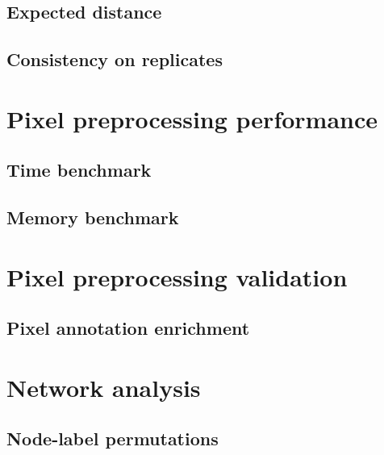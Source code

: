 \subsection{Expected distance}
\subsection{Consistency on replicates}

\section{Pixel preprocessing performance}

\subsection{Time benchmark}
\subsection{Memory benchmark}

\section{Pixel preprocessing validation}

\subsection{Pixel annotation enrichment}

\section{Network analysis}

\subsection{Node-label permutations}



